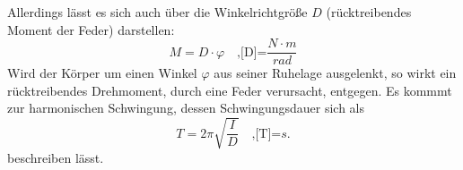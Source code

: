     \label{eqn:gl8}
Allerdings lässt es sich auch über die Winkelrichtgröße $D$ (rücktreibendes
Moment der Feder) darstellen:
\begin{equation}
    M = D \cdot \varphi \quad \text{,[D]=} \frac{N \cdot m}{rad}
    \label{eqn:gl9}
\end{equation}
Wird der Körper um einen Winkel $\varphi$ aus seiner Ruhelage ausgelenkt,
so wirkt ein rücktreibendes Drehmoment, durch eine Feder verursacht, 
entgegen. Es kommmt zur harmonischen Schwingung, dessen Schwingungsdauer
sich als
\begin{equation}
    T = 2 \pi \sqrt{\frac{I}{D}} \quad \text{,[T]=} s.
    \label{equ:gl10}
\end{equation}
beschreiben lässt.
\cite{sample}